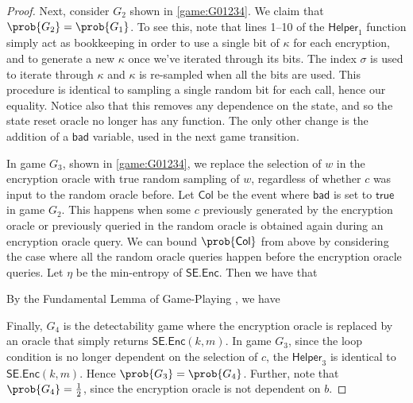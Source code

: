 \begin{proof}
Next, consider $G_2$ shown in \autoref{game:G01234}. We claim that $\prob{G_2}=\prob{G_1}$. To see this, note that lines 1--10 of the $\mathsf{Helper}_1$ function simply act as bookkeeping in order to use a single bit of $\kappa$ for each encryption, and to generate a new $\kappa$ once we've iterated through its bits. The index $\sigma$ is used to iterate through $\kappa$ and $\kappa$ is re-sampled when all the bits are used. This procedure is identical to sampling a single random bit for each call, hence our equality. Notice also that this removes any dependence on the state, and so the state reset oracle no longer has any function. The only other change is the addition of a $\mathsf{bad}$ variable, used in the next game transition.

In game $G_3$, shown in \autoref{game:G01234}, we replace the selection of $w$ in the encryption oracle with true random sampling of $w$, regardless of whether $c$ was input to the random oracle before. Let $\mathsf{Col}$ be the event where $\mathsf{bad}$ is set to $\mathsf{true}$ in game $G_2$. This happens when some $c$ previously generated by the encryption oracle or previously queried in the random oracle is obtained again during an encryption oracle query. We can bound $\prob{\mathsf{Col}}$ from above by considering the case where all the random oracle queries happen before the encryption oracle queries. Let $\eta$ be the min-entropy of $\mathsf{SE.Enc}$. Then we have that

By the Fundamental Lemma of Game-Playing \cite{EC:BelRog06}, we have

Finally, $G_4$ is the detectability game where the encryption oracle is replaced by an oracle that simply returns $\mathsf{SE.Enc}(k,m)$. In game $G_3$, since the loop condition is no longer dependent on the selection of $c$, the $\mathsf{Helper}_3$ is identical to $\mathsf{SE.Enc}(k,m)$. Hence $\prob{G_3}=\prob{G_4}$. Further, note that $\prob{G_4}=\frac{1}{2}$, since the encryption oracle is not dependent on $b$.


\end{proof}
